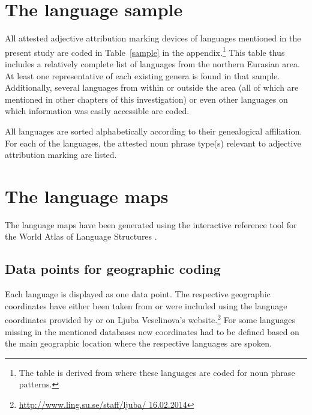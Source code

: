 \section{The language sample}
All attested adjective attribution marking devices of languages mentioned in the present study are coded in Table~\ref{sample} in the appendix.\footnote{The table is derived from \citet{AUTOTYP-NP} where these languages are coded for noun phrase patterns.} This table thus includes a relatively complete list of languages from the northern Eurasian area. At least one representative of each existing genera is found in that sample. Additionally, several languages from within or outside the area (all of which are mentioned in other chapters of this investigation) or even other languages on which information was easily accessible are coded.

All languages are sorted alphabetically according to their genealogical affiliation. For each of the languages, the attested noun phrase type(s) relevant to adjective attribution marking are listed.

\section{The language maps}
The language maps have been generated using the interactive reference tool 
for the World Atlas of Language Structures \citep{bibiko2005}. 

\subsection[Geographic coding]{Data points for geographic coding}
Each language is displayed as one data point. The respective geographic coordinates have either been taken from \cite{WALS} or were included using the language coordinates provided by \cite{AUTOTYP} or on Ljuba Veselinova's website.\footnote{\url{http://www.ling.su.se/staff/ljuba/ 16.02.2014}} For some languages missing in the mentioned databases new coordinates had to be defined based on the main geographic location where the respective languages are spoken.

